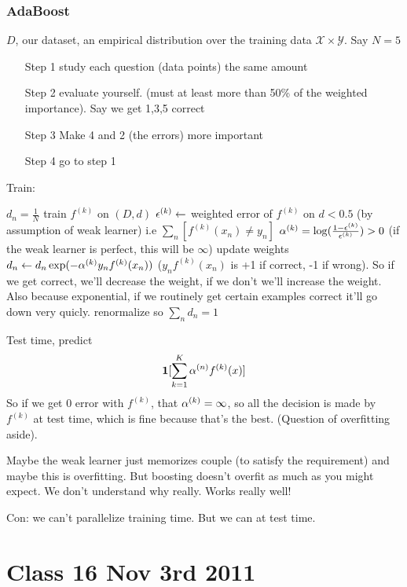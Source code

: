 \subsubsection{AdaBoost}
$D$, our dataset, an empirical distribution over the training data
$\mathcal{X\times Y}$.  Say $N=5$
\begin{enumerate}
\item[Step 1] study each question (data points) the same amount
\item[Step 2] evaluate yourself. (must at least more than 50\% of the
  weighted importance). Say we
  get 1,3,5 correct
\item[Step 3] Make 4 and 2 (the errors) more important
\item[Step 4] go to step 1 
\end{enumerate}
Train:
\begin{algorithmic}
  \STATE $d_n = \frac{1}{N}$
    \STATE train $f^{(k)}$ on $(D, d)$
    \STATE $\epsilon^{(k)} \gets $ weighted error of $f^{(k)}$ on $d <
    0.5$ (by assumption of weak learner) i.e $\sum_n[f^{(k)}(x_n)\neq y_n]$
    \STATE $\alpha^{(k)} = \log(\frac{1-\epsilon^{(k)}}{\epsilon^{(k)}}) > 0$ (if
    the weak learner is perfect, this will be $\infty$)
    \STATE update weights $d_n \gets d_n
    \exp(-\alpha^{(k)}y_nf^{(k)}(x_n))$ ($y_nf^{(k)}(x_n)$ is +1 if
    correct, -1 if wrong). So if we get correct, we'll decrease the
    weight, if we don't we'll increase the weight. Also because
    exponential, if we routinely get certain examples correct it'll go
    down very quicly.
    \STATE renormalize so $\sum_nd_n = 1$
  \ENDFOR
\end{algorithmic}

Test time, predict $$\mathbf{1}[\sum_{k=1}^K\alpha^{(n)}f^{(k)}(x)]$$
So if we get 0 error with $f^{(k)}$, that $\alpha^{(k)}=\infty$, so all
the decision is made by $f^{(k)}$ at test time, which is fine because
that's the best. (Question of overfitting aside).

Maybe the weak learner just memorizes couple (to satisfy the
requirement) and maybe this is overfitting.
But boosting doesn't overfit as much as you might expect. We don't
understand why really.
Works really well!

Con: we can't parallelize training time. But we can at test time.

\section{Class 16 Nov 3rd 2011}
\label{sec:class16}

